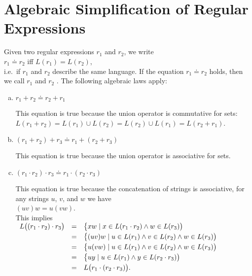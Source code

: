 \section{Algebraic Simplification of Regular Expressions}
Given two regular expressions $r_1$ and $r_2$, we write
\\[0.2cm]
\hspace*{1.3cm}
$r_1 \doteq r_2$ \quad iff \quad $L(r_1) = L(r_2)$,
\\[0.2cm]
i.e.~if $r_1$ and $r_2$ describe the same language.  If the equation $r_1 \doteq r_2$  holds, then we
call $r_1$ and $r_2$ .   The following algebraic laws apply:
\begin{enumerate}[(a)]
\item $r_1 + r_2 \doteq r_2 + r_1$

      This equation is true because the union operator is commutative for sets:
      \\[0.2cm]
      \hspace*{1.3cm}
      $L(r_1 + r_2) = L(r_1) \cup L(r_2) = L(r_2) \cup L(r_1) = L(r_2 + r_1)$.
\item $(r_1 + r_2) + r_3 \doteq r_1 + (r_2 + r_3)$

      This equation is true because the union operator is associative for sets.
\item $(r_1 \cdot r_2) \cdot r_3 \doteq r_1 \cdot (r_2 \cdot r_3)$

      This equation is true because the concatenation of strings is associative, for any strings
      $u$, $v$, and $w$ we have
      \\[0.2cm]
      \hspace*{1.3cm}
      $(u v) w = u (v w)$.
      \\[0.2cm]
      This implies
      \\[0.2cm]
      \hspace*{1.3cm}
      $
      \begin{array}[t]{lcl}
        L\bigl( (r_1 \cdot r_2) \cdot r_3\bigr) 
        & = & \bigl\{ x w \mid x \in L(r_1 \cdot r_2) \wedge w \in L(r_3)\bigr) \\[0.1cm]
        & = & \bigl\{ (u v) w \mid u \in L(r_1) \wedge v \in L(r_2) \wedge w \in L(r_3)\bigr) \\[0.1cm]
        & = & \bigl\{ u (v w) \mid u \in L(r_1) \wedge v \in L(r_2) \wedge w \in L(r_3)\bigr) \\[0.1cm]
        & = & \bigl\{ u y \mid u \in L(r_1) \wedge y \in L(r_2 \cdot r_3)\bigr) \\[0.1cm]
        & = & L\bigl( r_1 \cdot (r_2 \cdot r_3)\bigr).
      \end{array}
      $


\end{enumerate}
